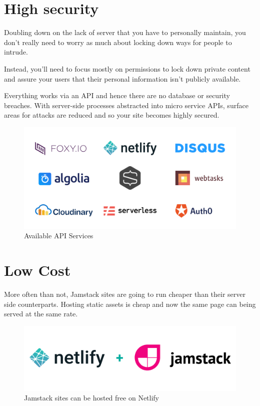 \documentclass[12pt,a4paper,oneside]{report}
\begin{document}
\section{High security}

\par 
Doubling down on the lack of server that you have to personally maintain, you don’t really need to worry as much about locking down ways for people to intrude.

\par
Instead, you'll need to focus mostly on permissions to lock down private content and assure your users that their personal information isn't publicly available.

\par
Everything works via an API and hence there are no database or security breaches. With server-side processes abstracted into micro service APIs, surface areas for attacks are reduced and so your site becomes highly secured.

\begin{figure}[H]
    \centering
    \includegraphics[scale=.3]{images/apis.png}
    \caption{Available API Services\cite{snip}}
\end{figure}

\section{Low Cost}

\par 
More often than not, Jamstack sites are going to run cheaper than their server side counterparts. Hosting static assets is cheap and now the same page can being served at the same rate.

\begin{figure}[H]
    \centering
    \includegraphics[scale=.3]{images/netlify.png}
    \caption{Jamstack sites  can be hosted free on Netlify\cite{netjam}}
\end{figure}
\end{document}
